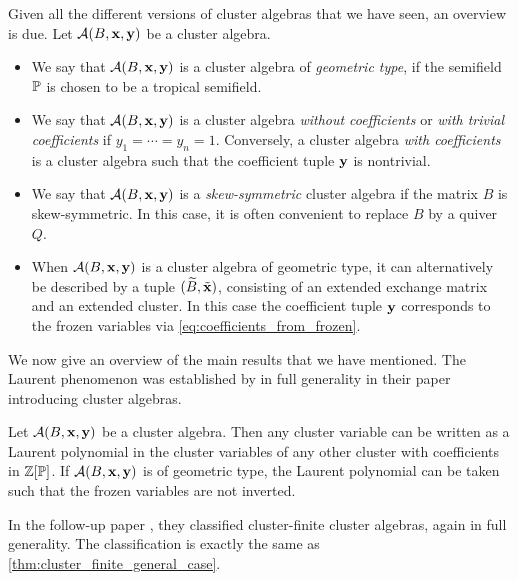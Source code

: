 Given all the different versions of cluster algebras that we have seen, an overview is
due. Let $\mathcal{A}(B, \mathbf{x}, \mathbf{y})$ be a cluster algebra.
\begin{itemize}
	\item We say that $\mathcal{A}(B, \mathbf{x}, \mathbf{y})$ is a cluster algebra of \emph{geometric
		      type}, if the semifield $\mathbb{P}$ is chosen to be
	      a tropical semifield.
	\item We say that $\mathcal{A}(B, \mathbf{x}, \mathbf{y})$ is a cluster algebra \emph{without
		      coefficients} or \emph{with trivial
		      coefficients} if $y_1 = \cdots = y_n =
		      1$. Conversely, a cluster algebra \emph{with coefficients} is a cluster algebra such that the coefficient tuple $\mathbf{y}$ is nontrivial.
	\item We say that $\mathcal{A}(B, \mathbf{x}, \mathbf{y})$ is a \emph{skew-symmetric} cluster
	      algebra if the matrix $B$ is skew-symmetric. In
	      this case, it is often convenient to replace $B$ by a quiver $Q$.
	\item When $\mathcal{A}(B, \mathbf{x}, \mathbf{y})$ is a cluster algebra of geometric type, it can alternatively
	      be described by a tuple $(\widetilde{B}, \tilde{\mathbf{x}})$, consisting of an extended exchange matrix and an
	      extended cluster. In this case the coefficient tuple $\mathbf{y}$ corresponds to the frozen
	      variables via \cref{eq:coefficients_from_frozen}.
\end{itemize}
%
We now give an overview of the main results that we have mentioned. The Laurent
phenomenon was established by \textcite{FominZelevinsky2002CAF} in full generality in
their paper introducing cluster algebras.
\begin{theorem}

	Let $\mathcal{A}(B, \mathbf{x}, \mathbf{y})$ be a cluster algebra. Then any cluster variable can be written
	as a Laurent polynomial in the cluster variables of any other cluster with coefficients
	in $\mathbb{Z}[\mathbb{P}]$. If $\mathcal{A}(B, \mathbf{x}, \mathbf{y})$ is of geometric type, the Laurent polynomial
	can be taken such that the frozen variables are not inverted.
\end{theorem}

In the follow-up paper \cite{FominZelevinsky2003CAFin}, they classified cluster-finite
cluster algebras, again in full generality. The classification is exactly the same as
\cref{thm:cluster_finite_general_case}.

